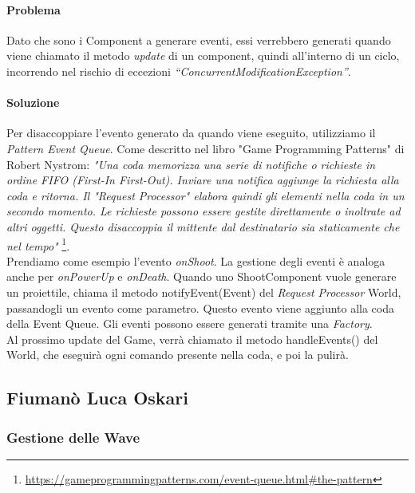 \documentclass[a4paper,12pt]{report}
\begin{document}
\paragraph{Problema} Dato che sono i Component a generare eventi, essi verrebbero generati quando viene chiamato il metodo \textit{update} di un component, quindi all’interno di un ciclo, incorrendo nel rischio di eccezioni \textit{“ConcurrentModificationException”}.

\paragraph{Soluzione} Per disaccoppiare l'evento generato da quando viene eseguito, utilizziamo il \textit{Pattern Event Queue}. 
Come descritto nel libro "Game Programming Patterns" di Robert Nystrom: \textit{"Una coda memorizza una serie di notifiche o richieste in ordine FIFO (First-In First-Out). 
Inviare una notifica aggiunge la richiesta alla coda e ritorna. Il "Request Processor" elabora quindi gli elementi nella coda in un secondo momento. 
Le richieste possono essere gestite direttamente o inoltrate ad altri oggetti. Questo disaccoppia il mittente dal destinatario sia staticamente che nel tempo"}
\footnote{\url{https://gameprogrammingpatterns.com/event-queue.html\#the-pattern}}.
\\
Prendiamo come esempio l'evento \textit{onShoot}. La gestione degli eventi è analoga anche per \textit{onPowerUp} e \textit{onDeath}. Quando uno ShootComponent vuole generare un proiettile, chiama il metodo notifyEvent(Event) del \textit{Request Processor} World, 
passandogli un evento come parametro. Questo evento viene aggiunto alla coda della Event Queue. Gli eventi possono essere generati tramite una \textit{Factory}.
\\
Al prossimo update del Game, verrà chiamato il metodo handleEvents() del World, che eseguirà ogni comando presente nella coda, e poi la pulirà.
\subsection*{Fiumanò Luca Oskari}

\subsubsection{Gestione delle Wave}
\end{document}
